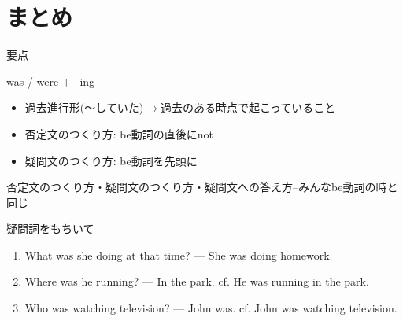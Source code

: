 \documentclass[aspectratio=169,xcolor={dvipsnames,table}]{beamer}
\begin{document}
\section{まとめ}
\begin{frame}[plain]{要点}
 
\begin{block}{was / were $+$ --ing}
\begin{itemize}[square]\small
 \item 過去進行形(〜していた)$\longrightarrow$過去のある時点で起こっていること%
 \item 否定文のつくり方: be動詞の直後にnot
 \item 疑問文のつくり方: be動詞を先頭に
\end{itemize}
\hfill{{\scriptsize 否定文のつくり方・疑問文のつくり方・疑問文への答え方--みんなbe動詞の時と同じ}}
\end{block}

\end{frame}
\begin{frame}[plain]{疑問詞をもちいて}
 \begin{enumerate}
  \item What was she doing at that time? --- She was doing homework.
  \item Where was he running? --- In the park.
	\mbox{}\hfill{}cf. He was running in the park.
  \item Who was watching television? --- John was.
	\mbox{}\hfill{}cf. John was watching television.
 \end{enumerate}

\hfill{}
\end{frame}
\end{document}
